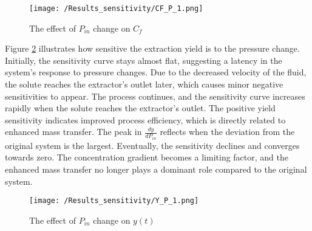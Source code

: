 \documentclass[../Article_Sensitivity_Analsysis.tex]{subfiles}
\begin{document}
	\begin{figure}[!ht]
		\centering
		\texttt{[image: /Results\_sensitivity/CF\_P\_1.png]}
		\caption{The effect of $P_{in}$ change on $C_f$}
		\label{fig:Sensitivty_P_CF}
	\end{figure}
	
	Figure \ref{fig:Sensitivty_P_y} illustrates how sensitive the extraction yield is to the pressure change. Initially, the sensitivity curve stays almost flat, suggesting a latency in the system's response to pressure changes. Due to the decreased velocity of the fluid, the solute reaches the extractor's outlet later, which causes minor negative sensitivities to appear. The process continues, and the sensitivity curve increases rapidly when the solute reaches the extractor's outlet. The positive yield sensitivity indicates improved process efficiency, which is directly related to enhanced mass transfer. The peak in $\frac{dy}{dP_{in}}$ reflects when the deviation from the original system is the largest. Eventually, the sensitivity declines and converges towards zero. The concentration gradient becomes a limiting factor, and the enhanced mass transfer no longer plays a dominant role compared to the original system.
	
	\begin{figure}[!ht]
		\centering
		\texttt{[image: /Results\_sensitivity/Y\_P\_1.png]}
		\caption{The effect of $P_{in}$ change on $y(t)$}
		\label{fig:Sensitivty_P_y}
	\end{figure}
		
\end{document}
